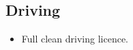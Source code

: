 \documentclass[12pt,a4paper]{res}
\begin{document}
\begin{resume}
\section{Driving}
\vspace{-0.7mm}
\begin{itemize}
\item[] Full clean driving licence.
\end{itemize}
  \vspace{-3mm}
  
\end{resume}
\end{document}
